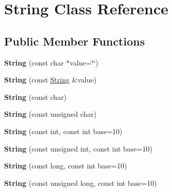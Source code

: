 \hypertarget{classString}{
\section{\-String \-Class \-Reference}
\label{classString}
}
\subsection*{\-Public \-Member \-Functions}
\begin{DoxyCompactItemize}
\item 
\hypertarget{classString_a7f902d8fff17edbac1a65dd809826242}{
{\bfseries \-String} (const char $\ast$value=\char`\"{}\char`\"{})}
\label{classString_a7f902d8fff17edbac1a65dd809826242}

\item 
\hypertarget{classString_aae710b6eceb89026f9a4da319ba041ae}{
{\bfseries \-String} (const \hyperlink{classString}{\-String} \&value)}
\label{classString_aae710b6eceb89026f9a4da319ba041ae}

\item 
\hypertarget{classString_a8fae47f6d9436dc8c01be8da557c8562}{
{\bfseries \-String} (const char)}
\label{classString_a8fae47f6d9436dc8c01be8da557c8562}

\item 
\hypertarget{classString_a8214a9eab5c3d484b87051bd17aa2d7d}{
{\bfseries \-String} (const unsigned char)}
\label{classString_a8214a9eab5c3d484b87051bd17aa2d7d}

\item 
\hypertarget{classString_a6f763090b66d4f1db447feb8134ce812}{
{\bfseries \-String} (const int, const int base=10)}
\label{classString_a6f763090b66d4f1db447feb8134ce812}

\item 
\hypertarget{classString_ad2eeb8af8feb49ef19968c43b12ccef6}{
{\bfseries \-String} (const unsigned int, const int base=10)}
\label{classString_ad2eeb8af8feb49ef19968c43b12ccef6}

\item 
\hypertarget{classString_a7468aaec52653eb6ee2463a917a4d111}{
{\bfseries \-String} (const long, const int base=10)}
\label{classString_a7468aaec52653eb6ee2463a917a4d111}

\item 
\hypertarget{classString_ae84dfcbf8b983149a151f4a075e1c0db}{
{\bfseries \-String} (const unsigned long, const int base=10)}
\label{classString_ae84dfcbf8b983149a151f4a075e1c0db}


\end{DoxyCompactItemize}
